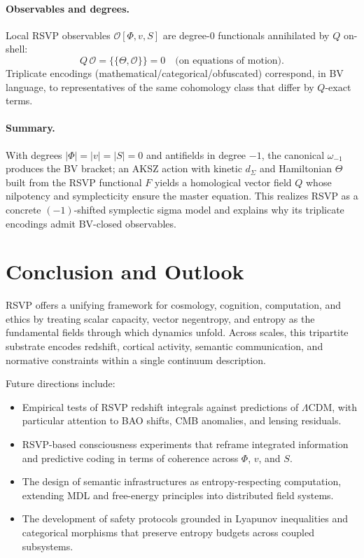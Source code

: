 \documentclass[12pt]{article}
\begin{document}
\paragraph{Observables and degrees.}
Local RSVP observables $\mathcal O[\Phi,v,S]$ are degree-$0$ functionals annihilated by $Q$ on-shell:
\[
Q\,\mathcal O = \{\!\{\Theta,\mathcal O\}\!\}=0 \quad \text{(on equations of motion)}.
\]
Triplicate encodings (mathematical/categorical/obfuscated) correspond, in BV language, to representatives of the same cohomology class that differ by $Q$-exact terms.

\paragraph{Summary.}
With degrees $|\Phi|=|v|=|S|=0$ and antifields in degree $-1$, the canonical $\omega_{-1}$ produces the BV bracket; an AKSZ action with kinetic $d_\Sigma$ and Hamiltonian $\Theta$ built from the RSVP functional $F$ yields a homological vector field $Q$ whose nilpotency and symplecticity ensure the master equation. This realizes RSVP as a concrete $(-1)$-shifted symplectic sigma model and explains why its triplicate encodings admit BV-closed observables.


\section{Conclusion and Outlook}

RSVP offers a unifying framework for cosmology, cognition, computation, and ethics by treating scalar capacity, vector negentropy, and entropy as the fundamental fields through which dynamics unfold. Across scales, this tripartite substrate encodes redshift, cortical activity, semantic communication, and normative constraints within a single continuum description.  

Future directions include:
\begin{itemize}
    \item Empirical tests of RSVP redshift integrals against predictions of $\Lambda$CDM, with particular attention to BAO shifts, CMB anomalies, and lensing residuals.
    \item RSVP-based consciousness experiments that reframe integrated information and predictive coding in terms of coherence across $\Phi$, $v$, and $S$.
    \item The design of semantic infrastructures as entropy-respecting computation, extending MDL and free-energy principles into distributed field systems.
    \item The development of safety protocols grounded in Lyapunov inequalities and categorical morphisms that preserve entropy budgets across coupled subsystems.
\end{itemize}
\end{document}

